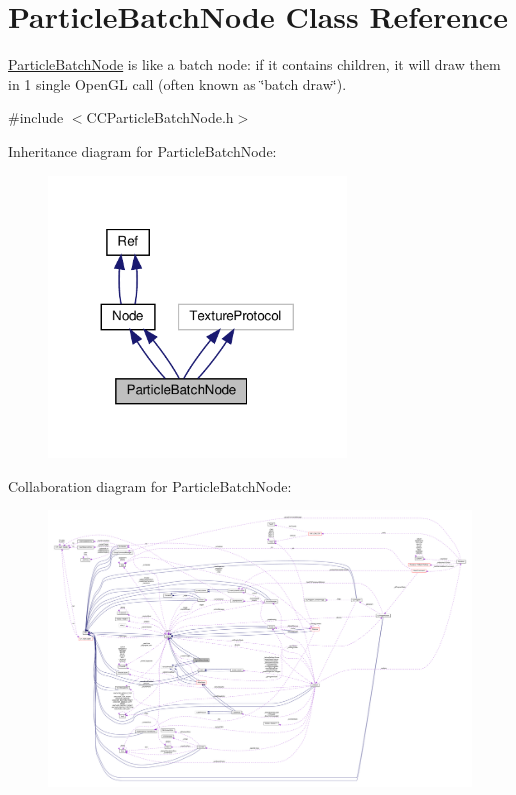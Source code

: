 \hypertarget{classParticleBatchNode}{}\section{Particle\+Batch\+Node Class Reference}
\label{classParticleBatchNode}


\hyperlink{classParticleBatchNode}{Particle\+Batch\+Node} is like a batch node\+: if it contains children, it will draw them in 1 single Open\+GL call (often known as \char`\"{}batch draw\char`\"{}).  




{\ttfamily \#include $<$C\+C\+Particle\+Batch\+Node.\+h$>$}



Inheritance diagram for Particle\+Batch\+Node\+:
\nopagebreak
\begin{figure}[H]
\begin{center}
\leavevmode
\includegraphics[width=224pt]{classParticleBatchNode__inherit__graph}
\end{center}
\end{figure}


Collaboration diagram for Particle\+Batch\+Node\+:
\nopagebreak
\begin{figure}[H]
\begin{center}
\leavevmode
\includegraphics[width=350pt]{classParticleBatchNode__coll__graph}
\end{center}
\end{figure}
